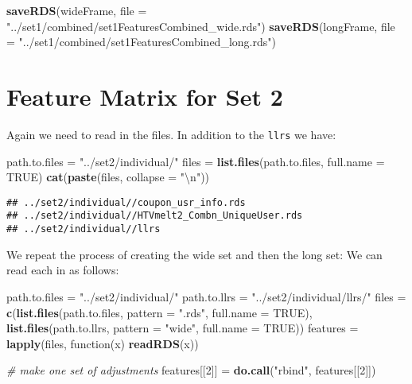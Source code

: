 \documentclass[10pt]{report}
\newenvironment{Shaded}{}{}
\newcommand{\KeywordTok}[1]{\textcolor[rgb]{0.00,0.44,0.13}{\textbf{{#1}}}}
\newcommand{\DataTypeTok}[1]{\textcolor[rgb]{0.56,0.13,0.00}{{#1}}}
\newcommand{\DecValTok}[1]{\textcolor[rgb]{0.25,0.63,0.44}{{#1}}}
\newcommand{\CharTok}[1]{\textcolor[rgb]{0.25,0.44,0.63}{{#1}}}
\newcommand{\StringTok}[1]{\textcolor[rgb]{0.25,0.44,0.63}{{#1}}}
\newcommand{\CommentTok}[1]{\textcolor[rgb]{0.38,0.63,0.69}{\textit{{#1}}}}
\newcommand{\OtherTok}[1]{\textcolor[rgb]{0.00,0.44,0.13}{{#1}}}
\newcommand{\NormalTok}[1]{{#1}}
\begin{document}
\begin{Shaded}
\begin{Highlighting}[]
\KeywordTok{saveRDS}\NormalTok{(wideFrame, }\DataTypeTok{file =} \StringTok{"../set1/combined/set1FeaturesCombined_wide.rds"}\NormalTok{)}
\KeywordTok{saveRDS}\NormalTok{(longFrame, }\DataTypeTok{file =} \StringTok{"../set1/combined/set1FeaturesCombined_long.rds"}\NormalTok{)}
\end{Highlighting}
\end{Shaded}

\section{Feature Matrix for Set 2}\label{feature-matrix-for-set-2}

Again we need to read in the files. In addition to the \verb!llrs! we
have:

\begin{Shaded}
\begin{Highlighting}[]
\NormalTok{path.to.files =}\StringTok{ "../set2/individual/"}
\NormalTok{files =}\StringTok{ }\KeywordTok{list.files}\NormalTok{(path.to.files, }\DataTypeTok{full.name =} \OtherTok{TRUE}\NormalTok{)}
\KeywordTok{cat}\NormalTok{(}\KeywordTok{paste}\NormalTok{(files, }\DataTypeTok{collapse =} \StringTok{"}\CharTok{\textbackslash{}n}\StringTok{"}\NormalTok{))}
\end{Highlighting}
\end{Shaded}

\begin{verbatim}
## ../set2/individual//coupon_usr_info.rds
## ../set2/individual//HTVmelt2_Combn_UniqueUser.rds
## ../set2/individual//llrs
\end{verbatim}

We repeat the process of creating the wide set and then the long set: We
can read each in as follows:

\begin{Shaded}
\begin{Highlighting}[]
\NormalTok{path.to.files =}\StringTok{ "../set2/individual/"}
\NormalTok{path.to.llrs =}\StringTok{ "../set2/individual/llrs/"}
\NormalTok{files =}\StringTok{ }\KeywordTok{c}\NormalTok{(}\KeywordTok{list.files}\NormalTok{(path.to.files, }\DataTypeTok{pattern =} \StringTok{".rds"}\NormalTok{, }\DataTypeTok{full.name =} \OtherTok{TRUE}\NormalTok{), }\KeywordTok{list.files}\NormalTok{(path.to.llrs, }
    \DataTypeTok{pattern =} \StringTok{"wide"}\NormalTok{, }\DataTypeTok{full.name =} \OtherTok{TRUE}\NormalTok{))}
\NormalTok{features =}\StringTok{ }\KeywordTok{lapply}\NormalTok{(files, function(x) }\KeywordTok{readRDS}\NormalTok{(x))}

\CommentTok{# make one set of adjustments}
\NormalTok{features[[}\DecValTok{2}\NormalTok{]] =}\StringTok{ }\KeywordTok{do.call}\NormalTok{(}\StringTok{"rbind"}\NormalTok{, features[[}\DecValTok{2}\NormalTok{]])}
\end{Highlighting}
\end{Shaded}
\end{document}
